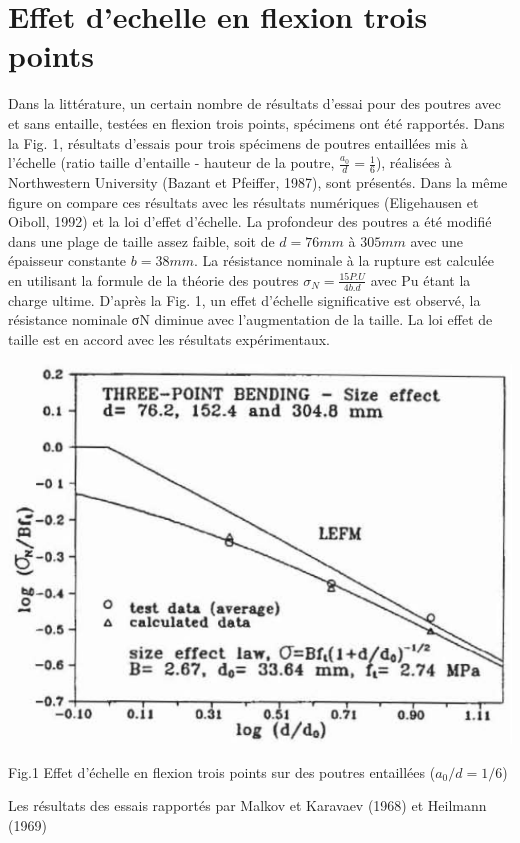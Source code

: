\documentclass{DGC_M2_report}
\begin{document}
\section{Effet d'echelle en flexion trois points}
Dans la littérature, un certain nombre de résultats d'essai pour des poutres avec et sans entaille,
testées en flexion trois points, spécimens ont été rapportés. Dans la Fig. 1, résultats d'essais pour
trois spécimens de poutres entaillées mis à l'échelle (ratio taille d'entaille - hauteur de la poutre,
$\frac{a_0}{d} = \frac{1}{6}$), réalisées à Northwestern University (Bazant et Pfeiffer, 1987), sont présentés. Dans
la même figure on compare ces résultats avec les résultats numériques (Eligehausen et Oiboll,
1992) et la loi d'effet d'échelle. La profondeur des poutres a été modifié dans une plage de taille
assez faible, soit de $d = 76 mm$ à $305 mm$ avec une épaisseur constante $b = 38 mm$. La résistance
nominale à la rupture est calculée en utilisant la formule de la théorie des poutres $\sigma_N = \frac{15P.U}{4b.d}$
avec Pu étant la charge ultime. D'après la Fig. 1, un effet d'échelle significative est observé, la
résistance nominale σN diminue avec l'augmentation de la taille. La loi effet de taille est en
accord avec les résultats expérimentaux.
\begin{center}
\includegraphics[scale=0.65]{Fig_1}
\end{center}
\begin{center}
\caption{Fig.1 Effet d'échelle en flexion trois points sur des poutres entaillées ($a_0/d=1/6$)}
\end{center}
Les résultats des essais rapportés par Malkov et Karavaev (1968) et Heilmann (1969)
\end{document}
